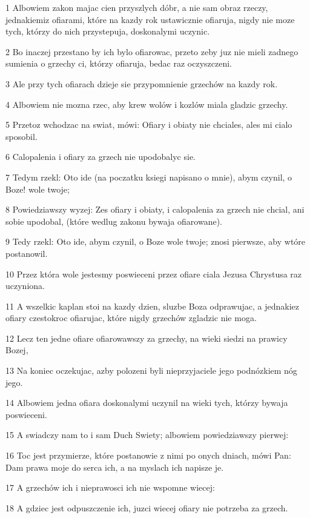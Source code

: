 \par 1 Albowiem zakon majac cien przyszlych dóbr, a nie sam obraz rzeczy, jednakiemiz ofiarami, które na kazdy rok ustawicznie ofiaruja, nigdy nie moze tych, którzy do nich przystepuja, doskonalymi uczynic.
\par 2 Bo inaczej przestano by ich bylo ofiarowac, przeto zeby juz nie mieli zadnego sumienia o grzechy ci, którzy ofiaruja, bedac raz oczyszczeni.
\par 3 Ale przy tych ofiarach dzieje sie przypomnienie grzechów na kazdy rok.
\par 4 Albowiem nie mozna rzec, aby krew wolów i kozlów miala gladzic grzechy.
\par 5 Przetoz wchodzac na swiat, mówi: Ofiary i obiaty nie chciales, ales mi cialo sposobil.
\par 6 Calopalenia i ofiary za grzech nie upodobalyc sie.
\par 7 Tedym rzekl: Oto ide (na poczatku ksiegi napisano o mnie), abym czynil, o Boze! wole twoje;
\par 8 Powiedziawszy wyzej: Zes ofiary i obiaty, i calopalenia za grzech nie chcial, ani sobie upodobal, (które wedlug zakonu bywaja ofiarowane).
\par 9 Tedy rzekl: Oto ide, abym czynil, o Boze wole twoje; znosi pierwsze, aby wtóre postanowil.
\par 10 Przez która wole jestesmy poswieceni przez ofiare ciala Jezusa Chrystusa raz uczyniona.
\par 11 A wszelkic kaplan stoi na kazdy dzien, sluzbe Boza odprawujac, a jednakiez ofiary czestokroc ofiarujac, które nigdy grzechów zgladzic nie moga.
\par 12 Lecz ten jedne ofiare ofiarowawszy za grzechy, na wieki siedzi na prawicy Bozej,
\par 13 Na koniec oczekujac, azby polozeni byli nieprzyjaciele jego podnózkiem nóg jego.
\par 14 Albowiem jedna ofiara doskonalymi uczynil na wieki tych, którzy bywaja poswieceni.
\par 15 A swiadczy nam to i sam Duch Swiety; albowiem powiedziawszy pierwej:
\par 16 Toc jest przymierze, które postanowie z nimi po onych dniach, mówi Pan: Dam prawa moje do serca ich, a na myslach ich napisze je.
\par 17 A grzechów ich i nieprawosci ich nie wspomne wiecej:
\par 18 A gdziec jest odpuszczenie ich, juzci wiecej ofiary nie potrzeba za grzech.
